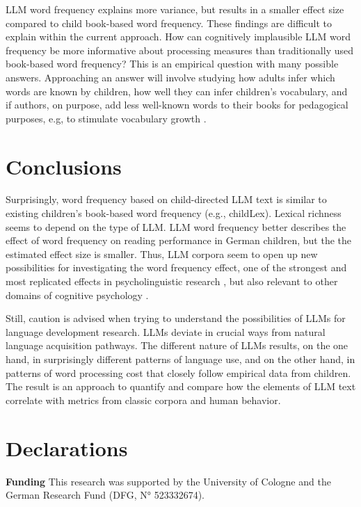 \documentclass[doc, a4paper, anonymous]{apa7}
\begin{document}
LLM word frequency explains more variance, but results in a smaller effect size compared to child book-based word frequency. These findings are difficult to explain within the current approach. How can cognitively implausible LLM word frequency be more informative about processing measures than traditionally used book-based word frequency? This is an empirical question with many possible answers. Approaching an answer will involve studying how adults infer which words are known by children, how well they can infer children's vocabulary, and if authors, on purpose, add less well-known words to their books for pedagogical purposes, e.g, to stimulate vocabulary growth \citep{korochkina_morphology_2025}. 


\section*{Conclusions}

Surprisingly, word frequency based on child-directed LLM text is similar to existing children's book-based word frequency (e.g., childLex). Lexical richness seems to depend on the type of LLM. LLM word frequency better describes the effect of word frequency on reading performance in German children, but the the estimated effect size is smaller. Thus, LLM corpora seem to open up new possibilities for investigating the word frequency effect, one of the strongest and most replicated effects in psycholinguistic research \citep{brysbaert_word_2018}, but also relevant to other domains of cognitive psychology \citep[i.e., object recognition][]{gregorova_access_2023}. 

Still, caution is advised when trying to understand the possibilities of LLMs for language development research. LLMs deviate in crucial ways from natural language acquisition pathways. The different nature of LLMs results, on the one hand, in surprisingly different patterns of language use, and on the other hand, in patterns of word processing cost that closely follow empirical data from children. The result is an approach to quantify and compare how the elements of LLM text correlate with metrics from classic corpora and human behavior.


\section*{Declarations}

\textbf{Funding} This research was supported by the University of Cologne and the German Research Fund (DFG, N° 523332674). 
\end{document}
